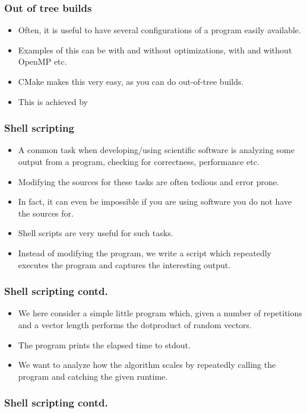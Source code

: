 \documentclass{beamer}
\begin{document}
\begin{frame}\frametitle{Out of tree builds}
\begin{itemize}
  \item Often, it is useful to have several configurations of a program easily available.
  \item Examples of this can be with and without optimizations, with and without OpenMP etc.
  \item CMake makes this very easy, as you can do out-of-tree builds.
  \item This is achieved by
    
\end{itemize}
\end{frame}

\begin{frame}\frametitle{Shell scripting}
  \begin{itemize}
    \item A common task when developing/using scientific software is analyzing some
      output from a program, checking for correctness, performance etc.
    \item Modifying the sources for these tasks are often tedious and error prone.
    \item In fact, it can even be impossible if you are using software you do not
      have the sources for.
    \item Shell scripts are very useful for such tasks.
    \item Instead of modifying the program, we write a script which repeatedly
      executes the program and captures the interesting output.
  \end{itemize}
\end{frame}

\begin{frame}\frametitle{Shell scripting contd.}
  \begin{itemize}
    \item We here consider a simple little program which, given a number of repetitions
      and a vector length performs the dotproduct of random vectors.
    \item The program prints the elapsed time to stdout.
    \item We want to analyze how the algorithm scales by repeatedly calling
      the program and catching the given runtime.
  \end{itemize}
\end{frame}

\begin{frame}\frametitle{Shell scripting contd.}
  
\end{frame}
\end{document}
